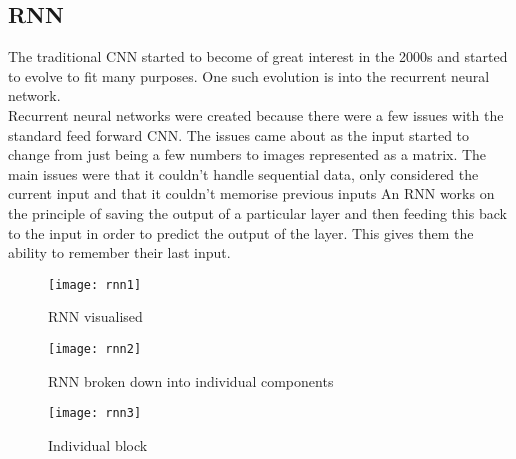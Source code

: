 \documentclass{article}
\begin{document}
\subsection{RNN}
The traditional CNN started to become of great interest in the 2000s and started to evolve to fit
many purposes. One such evolution is into the recurrent neural network.\\
Recurrent neural networks were created because there were a few issues with the standard feed
forward CNN. The issues came about as the input started to change from just being a few
numbers to images represented as a matrix. The main issues were that it couldn’t handle
sequential data, only considered the current input and that it couldn't memorise previous inputs
An RNN works on the principle of saving the output of a particular layer and then feeding this
back to the input in order to predict the output of the layer. This gives them the ability to
remember their last input.\\
\begin{figure}[h!]
    \centering
    \texttt{[image: rnn1]}
    \caption{RNN visualised }
\end{figure}
\begin{figure}[h]
    \centering
    \texttt{[image: rnn2]}
    \caption{RNN broken down into individual components }
\end{figure}
\begin{figure}[h]
    \centering
    \texttt{[image: rnn3]}
    \caption{Individual block}
\end{figure}
\end{document}
